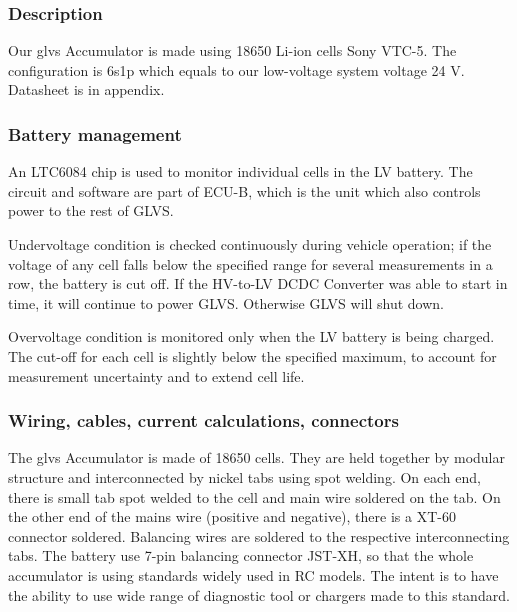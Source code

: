 \subsubsection{Description}
Our \gls{glvs} Accumulator is made using 18650 Li-ion cells Sony VTC-5. The configuration is 6s1p which equals to our low-voltage system voltage 24 V. Datasheet is in appendix.

\subsubsection{Battery management}

An LTC6084 chip is used to monitor individual cells in the LV battery. The circuit and software are part of ECU-B, which is the unit which also controls power to the rest of GLVS.

Undervoltage condition is checked continuously during vehicle operation; if the voltage of any cell falls below the specified range for several measurements in a row, the battery is cut off. If the HV-to-LV DCDC Converter was able to start in time, it will continue to power GLVS. Otherwise GLVS will shut down.

Overvoltage condition is monitored only when the LV battery is being charged. The cut-off for each cell is slightly below the specified maximum, to account for measurement uncertainty and to extend cell life.

\subsubsection{Wiring, cables, current calculations, connectors}

The \gls{glvs} Accumulator is made of 18650 cells. They are held together by modular structure and interconnected by nickel tabs using spot welding. On each end, there is small tab spot welded to the cell and main wire soldered on the tab. On the other end of the mains wire (positive and negative), there is a XT-60 connector soldered. Balancing wires are soldered to the respective interconnecting tabs. The battery use 7-pin balancing connector JST-XH, so that the whole accumulator is using standards widely used in RC models. The intent is to have the ability to use wide range of diagnostic tool or chargers made to this standard.

